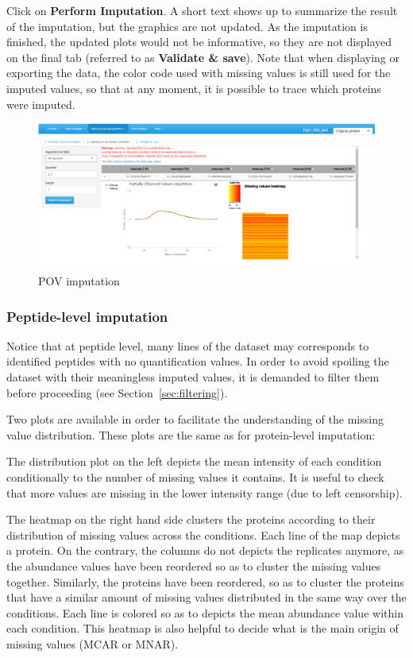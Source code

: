 \documentclass[12pt]{article}
\begin{document}
Click on \textbf{Perform Imputation}. A short text shows up to summarize the result of the imputation, but the graphics are not updated.
As the imputation is finished, the updated plots would not be informative, so they are not displayed on the final tab (referred to as \textbf{Validate \& save}).
Note that when displaying or exporting the data, the color code used with missing values is still used for the imputed values, so that at any moment, it is possible to trace which proteins were imputed.

\begin {figure}
\includegraphics[width=\textwidth]{images/protein-MEC.png}
\caption{POV imputation}\label{fig:prot-MEC}
\end {figure}

\subsubsection{Peptide-level imputation}\label{sec:peptideimputation}

Notice that at peptide level, many lines of the dataset may corresponds to identified peptides with no quantification values.
In order to avoid spoiling the dataset with their meaningless imputed values, it is demanded to filter them before proceeding (see Section~\ref{sec:filtering}). 

Two plots are available in order to facilitate the understanding of the missing value distribution.
These plots are the same as for protein-level imputation:

The distribution plot on the left depicts the mean intensity of each condition 
conditionally to the number of missing values it contains.
It is useful to check that more values are missing in the lower intensity 
range (due to left censorship).

The heatmap on the right hand side clusters the proteins according to their 
distribution of missing values across the conditions. Each line of the map 
depicts a protein. On the contrary, the columns do not depicts the replicates 
anymore, as the abundance values have been reordered so as to cluster the 
missing values together. Similarly, the proteins have been reordered, so as 
to cluster the proteins that have a similar amount of missing values 
distributed in the same way over the conditions. Each line is colored so as 
to depicts the mean abundance value within each condition. This heatmap is 
also helpful to decide what is the main origin of missing values (MCAR or MNAR).
\end{document}
